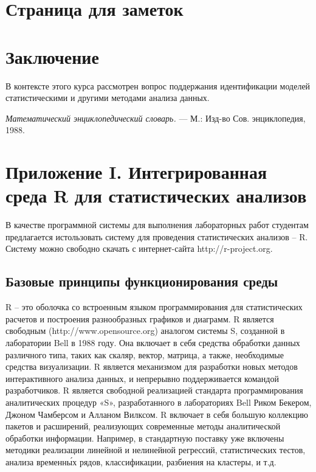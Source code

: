 \documentclass[12pt, openany, twoside]{book} %
\begin{document}
\chapter*{Страница для заметок}

\chapter*{Заключение}


В контексте этого курса рассмотрен вопрос поддержания идентификации моделей статистическими и другими методами анализа данных.


\begin{thebibliography}{99}
 \emph{Математический энциклопедический словарь.} ---
М.: Изд-во Сов. энциклопедия, 1988.
\end{thebibliography}
\chapter*{Приложение I. Интегрированная среда R для статистических анализов}

В качестве программной системы для выполнения лабораторных работ студентам предлагается истользовать систему для проведения статистических анализов – R. Систему можно свободно скачать с интернет-сайта http://r-project.org.

\section{Базовые принципы функционирования среды}

R – это оболочка со встроенным языком программирования для статистических расчетов и построения разнообразных графиков и диаграмм. R является свободным (http://www.opensource.org) аналогом системы S, созданной в лаборатории Bell в 1988 году. Она включает в себя средства обработки данных различного типа, таких как скаляр, вектор, матрица, а также, необходимые средства визуализации. R является механизмом для разработки новых методов интерактивного анализа данных, и непрерывно поддерживается командой разработчиков. R является свободной реализацией стандарта программирования аналитических процедур «S», разработанного в лабораториях Bell Риком Бекером, Джоном Чамберсом и Алланом Вилксом. R включает в себя большую коллекцию пакетов и расширений, реализующих современные методы аналитической обработки информации. Например, в стандартную поставку уже включены методики реализации линейной и нелинейной регрессий, статистических тестов, анализа временн\'{ы}х рядов, классификации, разбиения на кластеры, и т.д.
\end{document}
